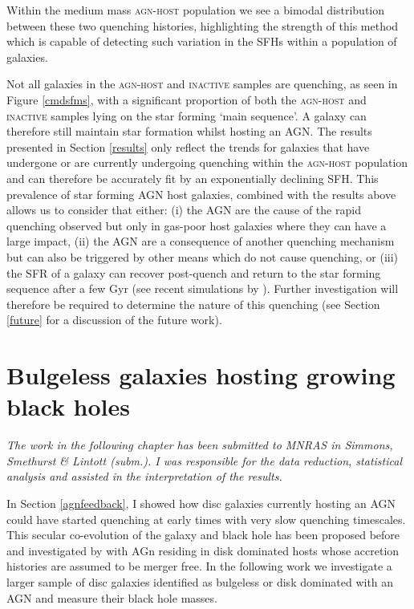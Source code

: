 Within the medium mass \textsc{agn-host} population we see a bimodal distribution between these two quenching histories, highlighting the strength of this method which is capable of detecting such variation in the SFHs within a population of galaxies. 

Not all galaxies in the \textsc{agn-host} and \textsc{inactive} samples are quenching, as seen in Figure \ref{cmdsfms}, with a significant proportion of both the \textsc{agn-host} and \textsc{inactive} samples lying on the star forming `main sequence'. A galaxy can therefore still maintain star formation whilst hosting an AGN. The results presented in Section \ref{results} only reflect the trends for galaxies that have undergone or are currently undergoing quenching within the \textsc{agn-host} population and can therefore be accurately fit by an exponentially declining SFH. This prevalence of star forming AGN host galaxies, combined with the results above allows us to consider that either: (i)  the AGN are the cause of the rapid quenching observed but only in gas-poor host galaxies where they can have a large impact, (ii) the AGN are a consequence of another quenching mechanism but can also be triggered by other means which do not cause quenching, or (iii) the SFR of a galaxy can recover post-quench and return to the star forming sequence after a few Gyr (see recent simulations by \citealt{pontzen16}). Further investigation will therefore be required to determine the nature of this quenching (see Section \ref{future} for a discussion of the future work).
 

\newpage

\section{Bulgeless galaxies hosting growing black holes}\label{intbulgeless}

\emph{The work in the following chapter has been submitted to MNRAS in Simmons, Smethurst \& Lintott (subm.). I was responsible for the data reduction, statistical analysis and assisted in the interpretation of the results.}

In Section \ref{agnfeedback}, I showed how disc galaxies currently hosting an AGN could have started quenching at early times with very slow quenching timescales. This secular co-evolution of the galaxy and black hole has been proposed before and investigated by \citet{Simmons13} with AGn residing in disk dominated hosts whose accretion histories are assumed to be merger free. In the following work we investigate a larger sample of disc galaxies identified as bulgeless or disk dominated with an AGN and measure their black hole masses. 

